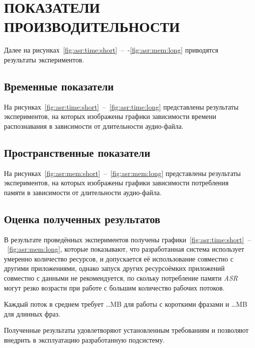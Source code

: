 \chapter{ПОКАЗАТЕЛИ ПРОИЗВОДИТЕЛЬНОСТИ}

Далее на рисунках~\ref{fig:asr:time:short}~--~-\ref{fig:asr:mem:long} приводятся
результаты экспериментов.

\section{Временные показатели}
На рисунках~\ref{fig:asr:time:short}~--~\ref{fig:asr:time:long} представлены
результаты экспериментов, на которых изображены графики зависимости времени
распознавания в зависимости от длительности аудио-файла.

\newpage
\section{Пространственные показатели}
На рисунках~\ref{fig:asr:mem:short}~--~\ref{fig:asr:mem:long} представлены
результаты экспериментов, на которых изображены графики зависимости потребления
памяти в зависимости от длительности аудио-файла.


\section{Оценка полученных результатов}
В результате проведённых экспериментов получены графики~\ref{fig:asr:time:short}~--~\ref{fig:asr:mem:long},
которые показывают, что разработанная система использует умеренно количество
ресурсов, и допускается её использование совместно с другими приложениями,
однако запуск других ресурсоёмких приложений совместно с данными не рекомендуется,
по скольку потребление памяти \textit{ASR} могут резко возрасти при работе
с большим количество рабочих потоков.

Каждый поток в среднем требует \dots MB для работы с короткими фразами и
\dots MB для длинных фраз.

Полученные результаты удовлетворяют установленным требованиям и позволяют
внедрить в эксплуатацию разработанную подсистему.
